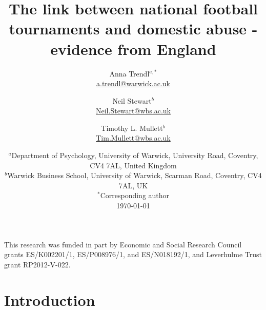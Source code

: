 \documentclass[12pt, a4paper]{article}
\title{}
\author{}
\date{}
\begin{document}
\title{The link between national football tournaments and domestic abuse - evidence from England}

\author{Anna Trendl$^{a,*}$ \\ \href{mailto:a.trendl@warwick.ac.uk}{a.trendl@warwick.ac.uk}\\
 \and Neil Stewart$^b$ \\ 
 \href{mailto:neil.stewart@wbs.ac.uk}{Neil.Stewart@wbs.ac.uk}
 \\ 
 \and Timothy L. Mullett$^b$ \\
 \href{mailto:Tim.Mullett@wbs.ac.uk}{Tim.Mullett@wbs.ac.uk}
 \\}
 
\date{
    $^a$Department of Psychology, University of Warwick, University Road, Coventry, CV4 7AL, United Kingdom\\
    $^b$Warwick Business School, University of Warwick, Scarman Road, Coventry, CV4 7AL, UK\\
    $^*$Corresponding author\\[2ex]%
    \today
}



\begin{titlepage}

\maketitle
\thispagestyle{empty}
\centering
This research was funded in part by Economic and Social Research Council grants ES/K002201/1, ES/P008976/1, and ES/N018192/1, and Leverhulme Trust grant RP2012-V-022. 
\clearpage
\thispagestyle{empty}
\RaggedRight



\end{titlepage}



\newpage
\RaggedRight
\section{Introduction}
\end{document}
